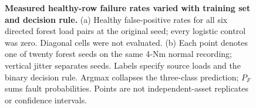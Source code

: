 \documentclass[10pt]{article}
\begin{document}
\clearpage
\begin{figure}[!ht]
\centering

\caption{\textbf{Measured healthy-row failure rates varied with training set and decision rule.} (a) Healthy false-positive rates for all six directed forest load pairs at the original seed; every logistic control was zero. Diagonal cells were not evaluated. (b) Each point denotes one of twenty forest seeds on the same 4-Nm normal recording; vertical jitter separates seeds. Labels specify source loads and the binary decision rule. Argmax collapses the three-class prediction; $P_F$ sums fault probabilities. Points are not independent-asset replicates or confidence intervals.}
\end{figure}
\clearpage
\end{document}
